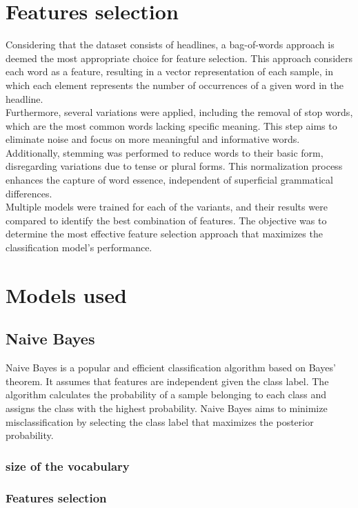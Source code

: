 \documentclass{class}
\begin{document}
\section{Features selection}
Considering that the dataset consists of headlines, a bag-of-words approach is deemed the most appropriate choice for feature selection.
This approach considers each word as a feature, resulting in a vector representation of each sample,
in which each element represents the number of occurrences of a given word in the headline.\\
Furthermore, several variations were applied, including the removal of stop words, which are the most common words lacking specific meaning.
This step aims to eliminate noise and focus on more meaningful and informative words.\\
Additionally, stemming was performed to reduce words to their basic form, disregarding variations due to tense or plural forms.
This normalization process enhances the capture of word essence, independent of superficial grammatical differences.\\
Multiple models were trained for each of the variants, and their results were compared to identify the best combination of features.
The objective was to determine the most effective feature selection approach that maximizes the classification model's performance.
\section{Models used}
\subsection{Naive Bayes}
Naive Bayes is a popular and efficient classification algorithm based on Bayes' theorem.
It assumes that features are independent given the class label. The algorithm calculates the probability of a
sample belonging to each class and assigns the class with the highest probability.
Naive Bayes aims to minimize misclassification by selecting the class label that maximizes the posterior probability.
\subsubsection*{size of the vocabulary}
\subsubsection*{Features selection}
\end{document}
